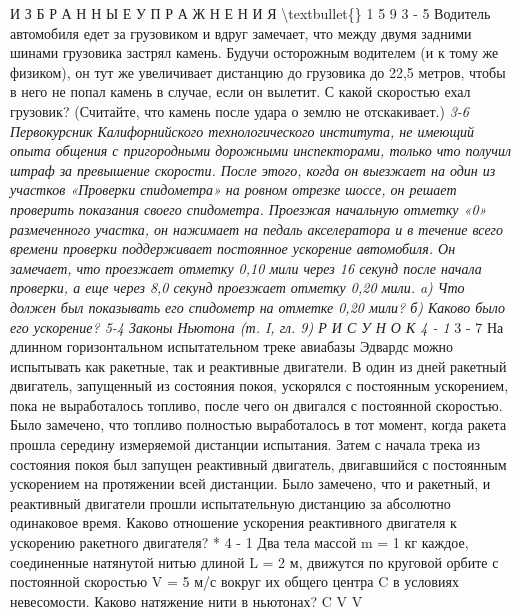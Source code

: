 \documentclass[10pt,oneside]{article}
\begin{document}
И З Б Р А Н Н Ы Е  У П Р А Ж Н Е Н И Я \textbackslash{}textbullet\{\} 1 5 9 \emph{ } 3 - 5 Водитель автомобиля едет за грузовиком и вдруг замечает, что между двумя задними шинами грузовика застрял камень. Будучи осторожным водителем (и к тому же физиком), он тут же увеличивает дистанцию до грузовика до 22,5 метров, чтобы в него не попал камень в случае, если он вылетит. С какой скоростью ехал грузовик? (Считайте, что камень после удара о землю не отскакивает.) \emph{ } \emph{ 3-6 Первокурсник Калифорнийского технологического института, не имеющий опыта общения с пригородными дорожными инспекторами, только что получил штраф за превышение скорости. После этого, когда он выезжает на один из участков «Проверки спидометра» на ровном отрезке шоссе, он решает проверить показания своего спидометра. Проезжая начальную отметку «0» размеченного участка, он нажимает на педаль акселератора и в течение всего времени проверки поддерживает постоянное ускорение автомобиля. Он замечает, что проезжает отметку 0,10 мили через 16 секунд после начала проверки, а еще через 8,0 секунд проезжает отметку 0,20 мили. a) Что должен был показывать его спидометр на отметке 0,20 мили? б) Каково было его ускорение? 5-4 Законы Ньютона (т. I, гл. 9) Р И С У Н О К  4 - 1 } \emph{ } 3 - 7 На длинном горизонтальном испытательном треке авиабазы Эдвардс можно испытывать как ракетные, так и реактивные двигатели. В один из дней ракетный двигатель, запущенный из состояния покоя, ускорялся с постоянным ускорением, пока не выработалось топливо, после чего он двигался с постоянной скоростью. Было замечено, что топливо полностью выработалось в тот момент, когда ракета прошла середину измеряемой дистанции испытания. Затем с начала трека из состояния покоя был запущен реактивный двигатель, двигавшийся с постоянным ускорением на протяжении всей дистанции. Было замечено, что и ракетный, и реактивный двигатели прошли испытательную дистанцию за абсолютно одинаковое время. Каково отношение ускорения реактивного двигателя к ускорению ракетного двигателя? * 4 - 1 Два тела массой m = 1 кг каждое, соединенные натянутой нитью длиной L = 2 м, движутся по круговой орбите с постоянной скоростью V = 5 м/с вокруг их общего центра C в условиях невесомости. Каково натяжение нити в ньютонах? C V V\par
\end{document}
